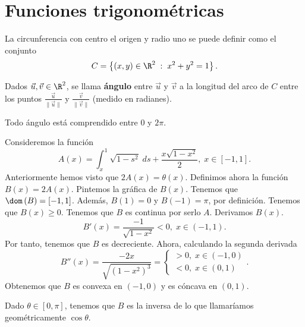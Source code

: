 \section{Funciones trigonométricas}
La circunferencia con centro el origen y radio uno se puede definir como el conjunto
\[ C = \left\{ \left(x,y\right) \in \R^{2} \; : \; x^{2} + y^{2} = 1\right\}  .\]
\begin{fdefinition}[]
\normalfont Dados $\displaystyle \vec{u},\vec{v} \in \R^{2}$, se llama \textbf{ángulo} entre $\displaystyle \vec{u} $ y $\displaystyle \vec{v} $ a la longitud del arco de $\displaystyle C $ entre los puntos $\displaystyle \frac{\vec{u}}{\|\vec{u}\|} $ y $\displaystyle \frac{\vec{v}}{\|\vec{v}\|} $ (medido en radianes).
\end{fdefinition}
\begin{observation}
\normalfont Todo ángulo está comprendido entre $\displaystyle 0 $ y $\displaystyle 2\pi  $.
\end{observation}
Consideremos la función
\[A\left(x\right) = \int^{1}_{x} \sqrt{1 - s^{2}} \; d s+ \frac{x\sqrt{1-x^{2}}}{2}, \; x \in \left[-1,1\right]  .\]
Anteriormente hemos visto que $\displaystyle 2A\left(x\right) = \theta\left(x\right) $. Definimos ahora la función $\displaystyle B\left(x\right) = 2A\left(x\right) $. Pintemos la gráfica de $\displaystyle B\left(x\right) $. Tenemos que $\displaystyle \dom\left(B\right) = \left[-1,1\right]  $. Además, $\displaystyle B\left(1\right) = 0 $ y $\displaystyle B\left(-1\right) = \pi  $, por definición. 
Tenemos que $\displaystyle B\left(x\right) \geq 0 $. Tenemos que $\displaystyle B $ es continua por serlo $\displaystyle A $. Derivamos $\displaystyle B\left(x\right) $.
\[B'\left(x\right) = \frac{-1}{\sqrt{1-x^{2}}} < 0, \; x \in \left(-1,1\right).\]
Por tanto, tenemos que $\displaystyle B $ es decreciente. Ahora, calculando la segunda derivada
\[B''\left(x\right) = \frac{-2x}{\sqrt{\left(1-x^{2}\right)^{3}}} =
\begin{cases}
>0, \; x \in \left(-1,0\right) \\
<0, \; x \in \left(0,1\right)
\end{cases}
.\]
Obtenemos que $\displaystyle B $ es convexa en $\displaystyle \left(-1,0\right) $ y es cóncava en $\displaystyle \left(0,1\right) $.
\begin{observation}
	\normalfont Dado $\displaystyle \theta \in [0,\pi] $, tenemos que $\displaystyle B $ es la inversa de lo que llamaríamos geométricamente $\displaystyle \cos\theta $.
\end{observation}
